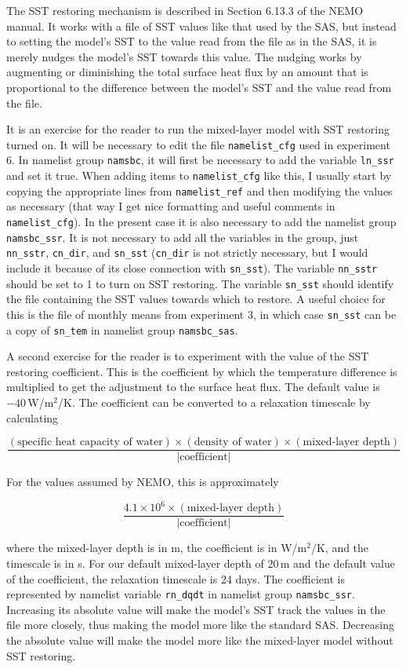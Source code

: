 The SST restoring mechanism is described in Section 6.13.3 of the NEMO manual.
It works with a file of SST values like that used by the SAS, but instead to setting the model's SST to the value read from the file as in the SAS, it is merely nudges the model's SST towards this value.
The nudging works by augmenting or diminishing the total surface heat flux by an amount that is proportional to the difference between the model's SST and the value read from the file.

It is an exercise for the reader to run the mixed-layer model with SST restoring turned on.
It will be necessary to edit the file \verb|namelist_cfg| used in experiment 6.
In namelist group \verb|namsbc|, it will first be necessary to add the variable \verb|ln_ssr| and set it true.
When adding items to \verb|namelist_cfg| like this, I usually start by copying the appropriate lines from \verb|namelist_ref| and then modifying the values as necessary (that way I get nice formatting and useful comments in \verb|namelist_cfg|).
In the present case it is also necessary to add the namelist group \verb|namsbc_ssr|.
It is not necessary to add all the variables in the group, just \verb|nn_sstr|, \verb|cn_dir|, and \verb|sn_sst| (\verb|cn_dir| is not strictly necessary, but I would include it because of its close connection with \verb|sn_sst|).
The variable \verb|nn_sstr| should be set to 1 to turn on SST restoring.
The variable \verb|sn_sst| should identify the file containing the SST values towards which to restore.
A useful choice for this is the file of monthly means from experiment 3, in which case \verb|sn_sst| can be a copy of \verb|sn_tem| in namelist group \verb|namsbc_sas|.

A second exercise for the reader is to experiment with the value of the SST restoring coefficient.
This is the coefficient by which the temperature difference is multiplied to get the adjustment to the surface heat flux.
The default value is $-40$\,W/m$^2$/K.
The coefficient can be converted to a relaxation timescale by calculating

\[
    \frac{\left(\textrm{specific heat capacity of water}\right)\times{}\left(\textrm{density of water}\right)\times{}\left(\textrm{mixed-layer depth}\right)}{\left|\textrm{coefficient}\right|}
\]

\noindent{}For the values assumed by NEMO, this is approximately\nopagebreak

\[
    \frac{4.1\times{}10^6\times{}\left(\textrm{mixed-layer depth}\right)}{\left|\textrm{coefficient}\right|}
\]

\noindent{}where the mixed-layer depth is in m, the coefficient is in W/m$^2$/K, and the timescale is in s.
For our default mixed-layer depth of 20\,m and the default value of the coefficient, the relaxation timescale is 24 days.
The coefficient is represented by namelist variable \verb|rn_dqdt| in namelist group \verb|namsbc_ssr|.
Increasing its absolute value will make the model's SST track the values in the file more closely, thus making the model more like the standard SAS.
Decreasing the absolute value will make the model more like the mixed-layer model without SST restoring.
